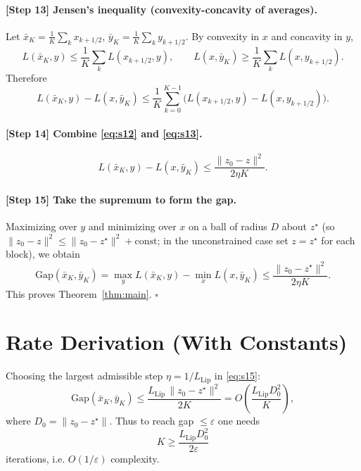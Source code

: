 \documentclass{article}
\begin{document}
\paragraph{[Step 13] Jensen's inequality (convexity-concavity of averages).}
Let $\bar x_K = \frac1K\sum_k x_{k+1/2}$, $\bar y_K = \frac1K\sum_k y_{k+1/2}$.
By convexity in $x$ and concavity in $y$,
\[
L(\bar x_K, y) \le \frac1K\sum_k L(x_{k+1/2}, y),
\qquad
L(x,\bar y_K) \ge \frac1K\sum_k L(x, y_{k+1/2}).
\]
Therefore
\begin{equation}
\label{eq:s13}
L(\bar x_K, y) - L(x, \bar y_K)
\le \frac1K\sum_{k=0}^{K-1}\big(L(x_{k+1/2},y)-L(x,y_{k+1/2})\big).
\end{equation}

\paragraph{[Step 14] Combine \eqref{eq:s12} and \eqref{eq:s13}.}
\begin{equation}
\label{eq:s14}
L(\bar x_K, y) - L(x, \bar y_K)
\le \frac{\|z_0 - z\|^2}{2\eta K}.
\end{equation}

\paragraph{[Step 15] Take the supremum to form the gap.}
Maximizing over $y$ and minimizing over $x$ on a ball of radius $D$ about
$z^\star$ (so $\|z_0-z\|^2 \le \|z_0-z^\star\|^2 + \text{const}$; in the
unconstrained case set $z=z^\star$ for each block), we obtain
\begin{equation}
\label{eq:s15}
\mathrm{Gap}(\bar x_K, \bar y_K)
= \max_y L(\bar x_K, y) - \min_x L(x,\bar y_K)
\le \frac{\|z_0 - z^\star\|^2}{2\eta K}.
\end{equation}
This proves Theorem~\ref{thm:main}. \hfill$\square$

\section*{Rate Derivation (With Constants)}

Choosing the largest admissible step $\eta = 1/L_{\mathrm{Lip}}$ in
\eqref{eq:s15}:
\begin{equation}
\mathrm{Gap}(\bar x_K, \bar y_K)
\le \frac{L_{\mathrm{Lip}}\,\|z_0 - z^\star\|^2}{2 K}
= O\!\left(\frac{L_{\mathrm{Lip}} D_0^2}{K}\right),
\end{equation}
where $D_0 = \|z_0 - z^\star\|$. Thus to reach gap $\le \varepsilon$ one needs
\[
K \ge \frac{L_{\mathrm{Lip}} D_0^2}{2\varepsilon}
\]
iterations, i.e. $O(1/\varepsilon)$ complexity.
\end{document}
